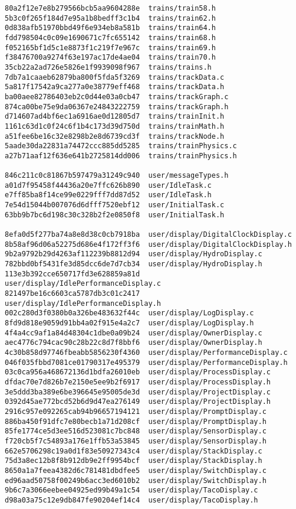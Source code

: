 \documentclass[twoside,a4paper]{refart}
\begin{document}
\begin{verbatim}
80a2f12e7e8b279566bcb5aa9604288e  trains/train58.h
5b3c0f265f184d7e95a1b8bedff3c1b4  trains/train62.h
0d838afb51970bbd49f6e934eb8a581b  trains/train64.h
fdd798504c0c09e1690671c7fc655142  trains/train68.h
f052165bf1d5c1e8873f1c219f7e967c  trains/train69.h
f38476700a9274f63e197ac17de4ae04  trains/train70.h
35cb22a2ad726e5826e1f9939098f967  trains/trains.h
7db7a1caaeb62879ba800f5fda5f3269  trains/trackData.c
5a817f17542a9ca277a0e38779eff468  trains/trackData.h
ba00aee82786403eb2c0d44e03a0cb47  trains/trackGraph.c
874ca00be75e9da06367e24843222759  trains/trackGraph.h
d714607ad4bf6ec1a6916ae0d12805d7  trains/trainInit.h
1161c63d1c0f24c6f1b4c173d39d750d  trains/trainMath.h
a51fee6be16c32e8298b2e8d6739cd3f  trains/trackNode.h
5aade30da22831a74472ccc885dd5285  trains/trainPhysics.c
a27b71aaf12f636e641b2725814dd006  trains/trainPhysics.h

846c211c0c81867b597479a31249c940  user/messageTypes.h
a01d7f95458f44436a20e7ffc626b890  user/IdleTask.c
e7ff85ba8f14ce99e0229fff7dd87d52  user/IdleTask.h
7e54d15044b007076d6dfff7520ebf12  user/InitialTask.c
63bb9b7bc6d198c30c328b2f2e0850f8  user/InitialTask.h

8efa0d5f277ba74a8e8d38c0cb7918ba  user/display/DigitalClockDisplay.c
8b58af96d06a52275d686e4f172ff3f6  user/display/DigitalClockDisplay.h
9b2a9792b29d4263af112239b8812d94  user/display/HydroDisplay.c
782bbd0bf5431fe3d85dcc6de7d7cb34  user/display/HydroDisplay.h
113e3b392cce650717fd3e628859a81d  user/display/IdlePerformanceDisplay.c
821497be16c6603ca5787db3c01c2417  user/display/IdlePerformanceDisplay.h
002c280d3f0380b0a326be483632f44c  user/display/LogDisplay.c
8fd9d818e9059d91bb4a02f915e4a2c7  user/display/LogDisplay.h
4f4a4cc9af1a84d48304c1dbe0a09b24  user/display/OwnerDisplay.c
aec4776c794cac90c28b22c8d7f8bbf6  user/display/OwnerDisplay.h
4c30b858d97746fbeabb5856230f4360  user/display/PerformanceDisplay.c
046f035fbbd7081ce01790317e495379  user/display/PerformanceDisplay.h
03c0ca956a468672136d1bdfa26010eb  user/display/ProcessDisplay.c
dfdac70e7d826b7e2150e5ee9b2f6917  user/display/ProcessDisplay.h
3e5ddd3ba389e6be396645e95005de3d  user/display/ProjectDisplay.c
0392d45ae772bcd52b6d9d47ea276149  user/display/ProjectDisplay.h
2916c957e092265cab94b96657194121  user/display/PromptDisplay.c
886ba450f91dfc7e80becb1a71d208cf  user/display/PromptDisplay.h
85fe1774ce5d3ee516d523081c7bc848  user/display/SensorDisplay.c
f720cb5f7c54893a176e1ffb53a53845  user/display/SensorDisplay.h
662e5706298c19a0d1f83e50927343c4  user/display/StackDisplay.c
75d3a8ec12b8f8b912db9e2ff9954bcf  user/display/StackDisplay.h
8650a1a7feea4382d6c781481dbdfee5  user/display/SwitchDisplay.c
ed96aad50758f00249b6acc3ed6010b2  user/display/SwitchDisplay.h
9b6c7a3066eebee04925ed99b49a1c54  user/display/TacoDisplay.c
d98a03a75c12e9db847fe90204ef14c4  user/display/TacoDisplay.h


\end{verbatim}
\end{document}
